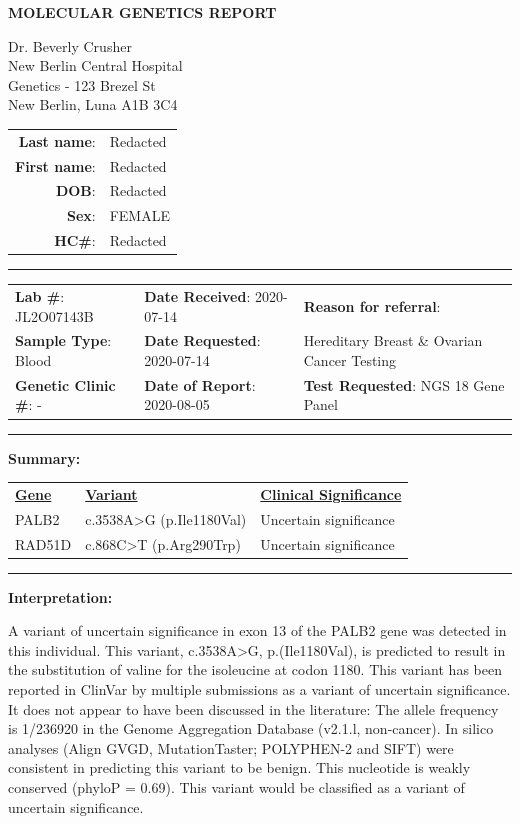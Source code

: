 \documentclass[10pt]{article}
\begin{document}
\begin{center}
\large \bf MOLECULAR GENETICS REPORT
\end{center}

\parbox{.45\textwidth}{
Dr. Beverly Crusher \\
New Berlin Central Hospital\\
Genetics - 123 Brezel St \\
New Berlin, Luna A1B 3C4
}\hfill
\parbox{.45\textwidth}{
\begin{tabular}{r l}
{\bf Last name}:& Redacted\\
{\bf First name}: & Redacted\\
{\bf DOB}: & Redacted\\
{\bf Sex}: & FEMALE \\
{\bf HC\#}: & Redacted\\
\end{tabular}
}

\rule{\textwidth}{1pt}

\begin{tabular}{l l l}
{\bf Lab \#}: JL2O07143B & {\bf Date Received}: 2020-07-14 & {\bf Reason for referral}:\\
{\bf Sample Type}: Blood & {\bf Date Requested}: 2020-07-14 & Hereditary Breast \& Ovarian Cancer Testing \\
{\bf Genetic Clinic \#}: - & {\bf Date of Report}: 2020-08-05 & {\bf Test Requested}: NGS 18 Gene Panel
\end{tabular}

\rule{\textwidth}{1pt}

{\bf Summary:}

\vspace{-24pt}
\begin{tabular}{>{\centering\arraybackslash}p{5cm} >{\centering\arraybackslash}p{6cm} >{\centering\arraybackslash}p{4cm}}
\underline{\bf Gene} & \underline{\bf Variant} & \underline{\bf Clinical Significance} \\
PALB2 & c.3538A>G (p.Ile1180Val) & Uncertain significance \\
RAD51D & c.868C>T (p.Arg290Trp) & Uncertain significance \\
\end{tabular}
 
\rule{\textwidth}{1pt}

{\bf Interpretation:}

A variant of uncertain significance in exon 13 of the PALB2 gene was detected in this individual. This variant, c.3538A>G, p.(Ile1180Val), is predicted to result in the substitution of valine for the isoleucine at codon 1180. This variant has been reported in ClinVar by multiple submissions as a variant of uncertain significance. It does not appear to have been discussed in the literature: The allele frequency is 1/236920 in the Genome Aggregation Database (v2.1.l, non-cancer). In silico analyses (Align GVGD, MutationTaster; POLYPHEN-2 and SIFT) were consistent in predicting this variant to be benign. This nucleotide is weakly conserved (phyloP = 0.69). This variant would be classified as a variant of uncertain significance. 
\end{document}

